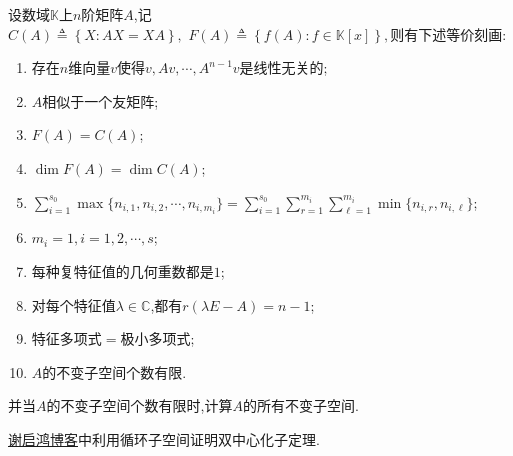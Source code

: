 \documentclass[../../main.tex]{subfiles}%
\begin{document}
\begin{theorem}[F(A)=C(A)的充要条件和不变子空间刻画]\label{theorem:F(A)=C(A)的充要条件和不变子空间刻画}
设数域$\mathbb{K}$上$n$阶矩阵$A$,记$C\left( A \right) \triangleq \left\{ X:AX=XA \right\},\,\,
F\left( A \right) \triangleq \left\{ f\left( A \right) :f\in \mathbb{K} \left[ x \right] \right\} ,$则有下述等价刻画:
\begin{enumerate}[(1)]
\item 存在$n$维向量$v$使得$v,Av,\cdots,A^{n-1}v$是线性无关的;

\item $A$相似于一个友矩阵;

\item  $F(A)=C(A)$;

\item  $\dim F(A)=\dim C(A)$;

\item $\sum\limits_{i=1}^{s_0}\max\{n_{i,1},n_{i,2},\cdots,n_{i,m_i}\}=\sum\limits_{i=1}^{s_0}\sum\limits_{r=1}^{m_i}\sum\limits_{\ell=1}^{m_i}\min\{n_{i,r},n_{i,\ell}\}$;

\item $m_i=1,i=1,2,\cdots,s$;

\item 每种复特征值的几何重数都是$1$;

\item 对每个特征值$\lambda\in\mathbb{C}$,都有$r(\lambda E-A)=n-1$;

\item 特征多项式$=$极小多项式;

\item $A$的不变子空间个数有限.
\end{enumerate}
并当$A$的不变子空间个数有限时,计算$A$的所有不变子空间.
\end{theorem}
\begin{note}
\href{https://www.doc88.com/p-9827401091114.html}{谢启鸿博客}中利用循环子空间证明双中心化子定理.
\end{note}
\end{document}
